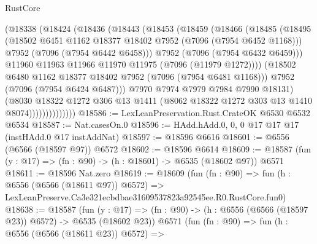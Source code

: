 \begin{lexlean}{RustCore}
\begin{coremodule}
                      (@18338
                        (@18424
                          (@18436
                            (@18443
                              (@18453
                                (@18459
                                  (@18466
                                    (@18485
                                      (@18495
                                        (@18502
                                          @6451
                                          @1162
                                          @18377
                                          @18402
                                          @7952
                                          (@7096 (@7954 @6452 @1168)))
                                        @7952
                                        (@7096 (@7954 @6442 @6458)))
                                      @7952
                                      (@7096 (@7954 @6432 @6459)))
                                    @11960
                                    @11963
                                    @11966
                                    @11970
                                    @11975
                                    (@7096 (@11979 @1272))))
                                (@18502 @6480 @1162 @18377 @18402 @7952 (@7096 (@7954 @6481 @1168)))
                                @7952
                                (@7096 (@7954 @6424 @6487)))
                              @7970
                              @7974
                              @7979
                              @7984
                              @7990
                              @18131)
                            (@8030
                              @18322
                              @1272
                              @306
                              @13
                              @1411
                              (@8062 @18322 @1272 @303 @13 @1410 @8074))))))))))))))
@18586 := LexLeanPreservation.Rust.CrateOK @6530 @6532 @6534
@18587 := Nat.casesOn.{0}
@18596 := HAdd.hAdd.{0, 0, 0} @17 @17 @17 (instHAdd.{0} @17 instAddNat)
@18597 := @18596 @6616
@18601 := @6556 (@6566 (@18597 @97)) @6572
@18602 := @18596 @6614
@18609 := @18587 (fun (y : @17) => (fn : @90) -> (h : @18601) -> @6535 (@18602 @97)) @6571
@18611 := @18596 Nat.zero
@18619 := @18609
    (fun (fn : @90) =>
    fun (h : @6556 (@6566 (@18611 @97)) @6572) =>
    LexLeanPreserve.Ca3e321ecbdbae31609537823a92545ee.R0.RustCore.fun0)
@18638 := @18587
    (fun (y : @17) => (fn : @90) -> (h : @6556 (@6566 (@18597 @23)) @6572) -> @6535 (@18602 @23))
    @6571
    (fun (fn : @90) =>
    fun (h : @6556 (@6566 (@18611 @23)) @6572) =>

\end{coremodule}
\end{lexlean}
